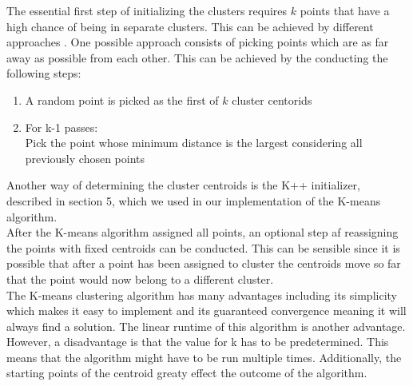 The essential first step of initializing the clusters requires $k$ points that have a high chance of being in separate clusters. This can be achieved by different approaches . One possible approach consists of picking points which are as far away as possible from each other. This can be achieved by the conducting the following steps: \cite{MMDS}
\begin{enumerate}
	\item	A random point is picked as the first of $k$ cluster centorids
	\item	For k-1 passes: \\
	Pick the point whose minimum distance is the largest considering all previously chosen points
	
\end{enumerate}
Another way of determining the cluster centroids is the K++ initializer, described in section 5, which we used in our implementation of the K-means algorithm.\\
After the K-means algorithm assigned all points, an optional step af reassigning the points with fixed centroids can be conducted. This can be sensible since it is possible that after a point has been assigned to cluster the centroids move so far that the point would now belong to a different cluster.\\
The K-means clustering algorithm has many advantages including its simplicity which makes it easy to implement and its guaranteed convergence meaning it will always find a solution. The linear runtime of this algorithm is another advantage. However, a disadvantage is that the value for k has to be predetermined. This means that the algorithm might have to be run multiple times. Additionally, the starting points of the centroid greaty effect the outcome of the algorithm.
